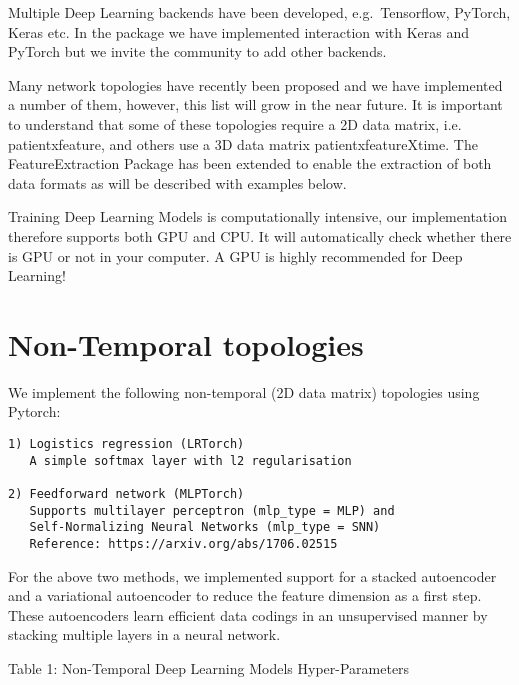 \documentclass[]{article}
\begin{document}
Multiple Deep Learning backends have been developed, e.g.~Tensorflow,
PyTorch, Keras etc. In the package we have implemented interaction with
Keras and PyTorch but we invite the community to add other backends.

Many network topologies have recently been proposed and we have
implemented a number of them, however, this list will grow in the near
future. It is important to understand that some of these topologies
require a 2D data matrix, i.e.
\textbar{}patient\textbar{}x\textbar{}feature\textbar{}, and others use
a 3D data matrix
\textbar{}patient\textbar{}x\textbar{}feature\textbar{}X\textbar{}time\textbar{}.
The FeatureExtraction Package has been extended to enable the extraction
of both data formats as will be described with examples below.

Training Deep Learning Models is computationally intensive, our
implementation therefore supports both GPU and CPU. It will
automatically check whether there is GPU or not in your computer. A GPU
is highly recommended for Deep Learning!

\section{Non-Temporal topologies}\label{non-temporal-topologies}

We implement the following non-temporal (2D data matrix) topologies
using Pytorch:

\begin{verbatim}
1) Logistics regression (LRTorch)
   A simple softmax layer with l2 regularisation

2) Feedforward network (MLPTorch) 
   Supports multilayer perceptron (mlp_type = MLP) and 
   Self-Normalizing Neural Networks (mlp_type = SNN)
   Reference: https://arxiv.org/abs/1706.02515
\end{verbatim}

For the above two methods, we implemented support for a stacked
autoencoder and a variational autoencoder to reduce the feature
dimension as a first step. These autoencoders learn efficient data
codings in an unsupervised manner by stacking multiple layers in a
neural network.

Table 1: Non-Temporal Deep Learning Models Hyper-Parameters
\end{document}
